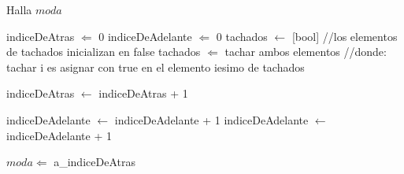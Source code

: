 \begin{algorithm}
\caption{Halla $moda$}
\begin{algorithmic}[1]
\STATE indiceDeAtras $\Leftarrow$ 0
\STATE indiceDeAdelante $\Leftarrow$ 0
\STATE tachados $\leftarrow$ [bool] //los elementos de tachados inicializan en false
        \STATE tachados $\Leftarrow$ tachar ambos elementos //donde: tachar i es asignar con true en el elemento iesimo de tachados

            \STATE indiceDeAtras $\leftarrow$ indiceDeAtras + 1
        \ENDWHILE
    
            \STATE indiceDeAdelante $\leftarrow$ indiceDeAdelante + 1
        \ENDWHILE
    \ELSE
        \STATE indiceDeAdelante $\leftarrow$ indiceDeAdelante + 1
    \ENDIF

\ENDWHILE
\STATE $moda \Leftarrow$ a_{indiceDeAtras}
\end{algorithmic}
\end{algorithm}